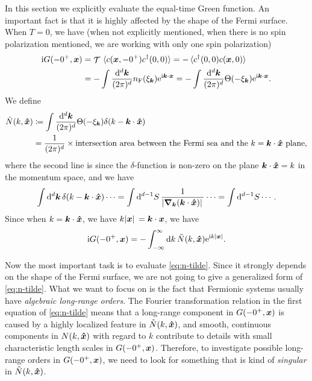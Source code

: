 \documentclass[hyperref, a4paper]{article}
\DeclareMathOperator{\timeorder}{\mathcal{T}}
\newcommand*{\ii}{\mathrm{i}}
\newcommand*{\ee}{\mathrm{e}}
\begin{document}
In this section we explicitly evaluate the equal-time Green function.  
An important fact is that it is highly affected by the shape of the Fermi surface. When $T=0$, we have 
(when not explicitly mentioned, when there is no spin polarization mentioned, we are working with only 
one spin polarization)
\begin{equation} 
    \begin{aligned}
        \ii G(-0^+, \vb*{x}) &= \timeorder \expval*{c(\vb*{x}, -0^+) c^\dagger(0, 0)} = - \expval*{c^\dagger(0, 0) c(\vb*{x}, 0)} \\
        &= - \int \frac{\dd[d]{\vb*{k}}}{(2\pi)^d} n_\text{F}(\xi_{\vb*{k}}) \ee^{\ii \vb*{k} \cdot \vb*{x}}
        = - \int \frac{\dd[d]{\vb*{k}}}{(2\pi)^d} \Theta(-\xi_{\vb*{k}}) \ee^{\ii \vb*{k} \cdot \vb*{x}}.
    \end{aligned}
\end{equation}
We define 
\begin{equation}
    \begin{aligned}
        \tilde{N}(k, \vu*{x}) &\coloneqq \int \frac{\dd[d]{\vb*{k}}}{(2\pi)^d} \Theta(-\xi_{\vb*{k}}) \delta(k - \vb*{k} \cdot \vu*{x}) \\
        &= \frac{1}{(2\pi)^d} \times \text{intersection area between the Fermi sea and the $k = \vb*{k} \cdot \vu*{x}$ plane} ,
    \end{aligned}
    \label{eq:n-tilde}
\end{equation}
where the second line is since the $\delta$-function is non-zero on the plane $\vb*{k} \cdot \vu*{x} = k$ in 
the momentum space, and we have 
\[
    \int \dd[d]{\vb*{k}} \delta(k - \vb*{k} \cdot \vu*{x}) \cdots = \int \dd[d-1]{{S}} \frac{1}{\abs*{\grad_{\vb*{k}} (\vb*{k} \cdot \vu*{x})}} \cdots = \int \dd[d-1]{{S}} \cdots.
\] 
Since when $k = \vb*{k} \cdot \vu*{x}$, we have $k \abs*{\vb*{x}} = \vb*{k} \cdot \vb*{x}$, we have 
\begin{equation}
    \ii G(-0^+, \vb*{x}) = - \int_{-\infty}^\infty \dd{k} \tilde{N}(k, \vu*{x}) \ee^{\ii k \abs*{\vb*{x}}}.
    \label{eq:n-tilde-to-green}
\end{equation}

Now the most important task is to evaluate \eqref{eq:n-tilde}. Since it strongly depends on the shape of 
the Fermi surface, we are not going to give a generalized form of \eqref{eq:n-tilde}. What we want to focus 
on is the fact that Fermionic systems usually have \emph{algebraic long-range orders}. The Fourier transformation
relation in the first equation of \eqref{eq:n-tilde} means that a long-range component 
in $G(- 0^+, \vb*{x})$ is caused by a highly localized feature in $\tilde{N}(k, \vu*{x})$, and 
smooth, continuous components in $N(k, \vu*{x})$ with regard to $k$ contribute to details with small 
characteristic length scales in $G(-0^+, \vb*{x})$. Therefore, to investigate possible long-range orders 
in $G(-0^+, \vb*{x})$, we need to look for something that is kind of \emph{singular} in $\tilde{N}(k, \vu*{x})$.
\end{document}
